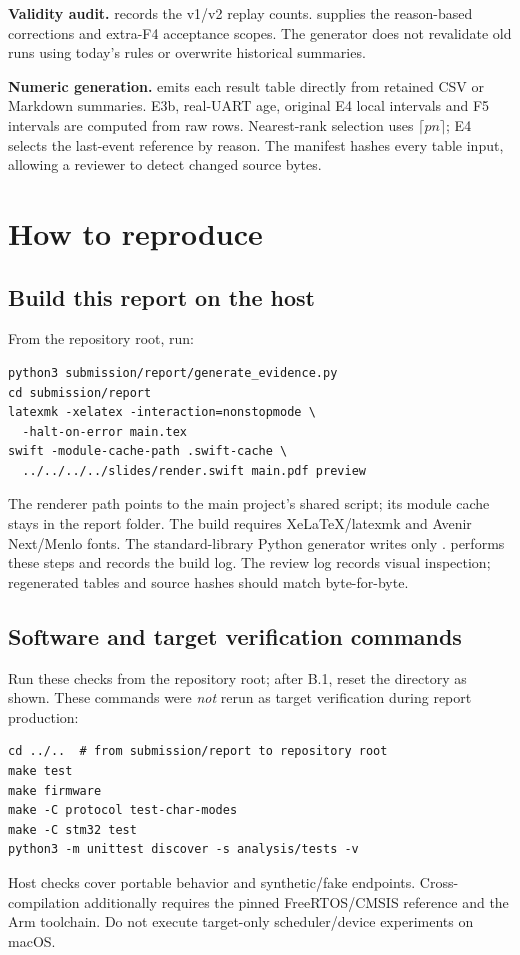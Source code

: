 \documentclass[a4paper,11pt]{article}
\newcommand{\page}{\clearpage}
\begin{document}
\textbf{Validity audit.}  records the v1/v2 replay counts.  supplies the reason-based corrections and extra-F4 acceptance scopes. The generator does not revalidate old runs using today's rules or overwrite historical summaries.

\textbf{Numeric generation.}  emits each result table directly from retained CSV or Markdown summaries. E3b, real-UART age, original E4 local intervals and F5 intervals are computed from raw rows. Nearest-rank selection uses $\lceil pn\rceil$; E4 selects the last-event reference by reason. The manifest hashes every table input, allowing a reviewer to detect changed source bytes.
\page
\section{How to reproduce}
\subsection{Build this report on the host}
From the repository root, run:
\begin{verbatim}
python3 submission/report/generate_evidence.py
cd submission/report
latexmk -xelatex -interaction=nonstopmode \
  -halt-on-error main.tex
swift -module-cache-path .swift-cache \
  ../../../../slides/render.swift main.pdf preview
\end{verbatim}
The renderer path points to the main project's shared script; its module cache stays in the report folder. The build requires XeLaTeX/latexmk and Avenir Next/Menlo fonts. The standard-library Python generator writes only .  performs these steps and records the build log. The review log records visual inspection; regenerated tables and source hashes should match byte-for-byte.

\subsection{Software and target verification commands}
Run these checks from the repository root; after B.1, reset the directory as shown. These commands were \emph{not} rerun as target verification during report production:
\begin{verbatim}
cd ../..  # from submission/report to repository root
make test
make firmware
make -C protocol test-char-modes
make -C stm32 test
python3 -m unittest discover -s analysis/tests -v
\end{verbatim}
Host checks cover portable behavior and synthetic/fake endpoints. Cross-compilation additionally requires the pinned FreeRTOS/CMSIS reference and the Arm toolchain. Do not execute target-only scheduler/device experiments on macOS.
\end{document}

